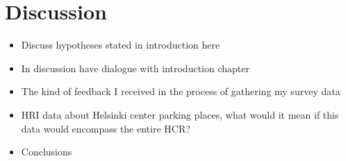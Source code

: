 \section{Discussion}
\justify
\begin{itemize}
  \item Discuss hypotheses stated in introduction here
  \item In discussion have dialogue with introduction chapter
  \item The kind of feedback I received in the process of gathering my survey data
  \item HRI data about Helsinki center parking places, what would it mean if this data would encompass the entire HCR?
  \item Conclusions
\end{itemize}